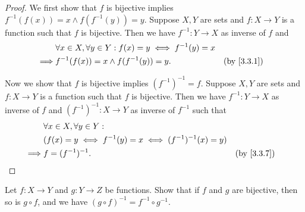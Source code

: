 \begin{proof}
  We first show that \(f\) is bijective implies \(f^{-1}(f(x)) = x \land f(f^{-1}(y)) = y\).
  Suppose \(X, Y\) are sets and \(f : X \to Y\) is a function such that \(f\) is bijective.
  Then we have \(f^{-1} : Y \to X\) as inverse of \(f\) and
  \begin{align*}
             & \forall x \in X, \forall y \in Y : f(x) = y \iff f^{-1}(y) = x                               \\
    \implies & f^{-1}(f(x)) = x \land f(f^{-1}(y)) = y.                       &  & \text{(by \cref{3.3.1})}
  \end{align*}

  Now we show that \(f\) is bijective implies \((f^{-1})^{-1} = f\).
  Suppose \(X, Y\) are sets and \(f : X \to Y\) is a function such that \(f\) is bijective.
  Then we have \(f^{-1} : Y \to X\) as inverse of \(f\) and \((f^{-1})^{-1} : X \to Y\) as inverse of \(f^{-1}\) such that
  \begin{align*}
             & \forall x \in X, \forall y \in Y :                                                    \\
             & (f(x) = y \iff f^{-1}(y) = x \iff (f^{-1})^{-1}(x) = y)                               \\
    \implies & f = (f^{-1})^{-1}.                                      &  & \text{(by \cref{3.3.7})}
  \end{align*}
\end{proof}

\begin{ex}\label{ex:3.3.7}
  Let \(f : X \to Y\) and \(g : Y \to Z\) be functions.
  Show that if \(f\) and \(g\) are bijective, then so is \(g \circ f\), and we have \((g \circ f)^{-1} = f^{-1} \circ g^{-1}\).
\end{ex}

